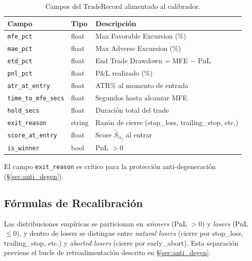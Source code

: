 \documentclass[11pt,a4paper]{article}
\newcommand{\score}{\hat{S}_{\alpha_f}}
\newcommand{\code}[1]{\texttt{\small #1}}
\begin{document}
\begin{table}[H]
\centering
\caption{Campos del TradeRecord alimentado al calibrador.}
\label{tab:traderecord}
\begin{tabular}{lll}
\toprule
\textbf{Campo} & \textbf{Tipo} & \textbf{Descripci\'on} \\
\midrule
\code{mfe\_pct} & float & Max Favorable Excursion (\%) \\
\code{mae\_pct} & float & Max Adverse Excursion (\%) \\
\code{etd\_pct} & float & End Trade Drawdown = MFE $-$ PnL \\
\code{pnl\_pct} & float & P\&L realizado (\%) \\
\code{atr\_at\_entry} & float & ATR\% al momento de entrada \\
\code{time\_to\_mfe\_secs} & float & Segundos hasta alcanzar MFE \\
\code{hold\_secs} & float & Duraci\'on total del trade \\
\code{exit\_reason} & string & Raz\'on de cierre (stop\_loss, trailing\_stop, etc.) \\
\code{score\_at\_entry} & float & Score $\score$ al entrar \\
\code{is\_winner} & bool & PnL $> 0$ \\
\bottomrule
\end{tabular}
\end{table}

El campo \code{exit\_reason} es cr\'itico para la protecci\'on
anti-degeneraci\'on (\S\ref{sec:anti_degen}).


\subsection{F\'ormulas de Recalibraci\'on}
\label{sec:recalib_formulas}

Las distribuciones emp\'iricas se particionan en \textit{winners}
(PnL $> 0$) y \textit{losers} (PnL $\leq 0$), y dentro de losers
se distingue entre \textit{natural losers} (cierre por stop\_loss,
trailing\_stop, etc.) y \textit{aborted losers} (cierre por
early\_abort). Esta separaci\'on previene el bucle de retroalimentaci\'on
descrito en \S\ref{sec:anti_degen}.
\end{document}
